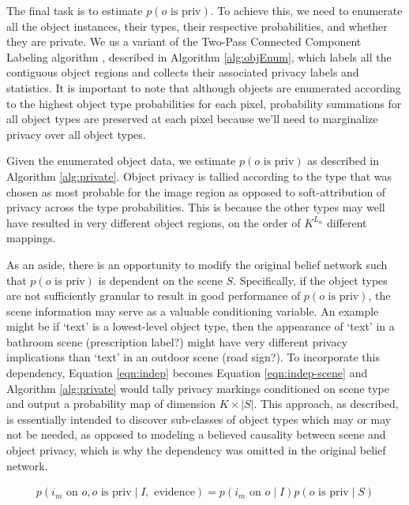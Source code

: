 \documentclass[11pt]{article}
\begin{document}
The final task is to estimate $p(o \textrm{ is priv})$.  To achieve this, we need to enumerate all the object instances, their types, their respective probabilities, and whether they are private.  We us a variant of the Two-Pass Connected Component Labeling algorithm \cite{hoshen1976percolation}, described in Algorithm \ref{alg:objEnum}, which labels all the contiguous object regions and collects their associated privacy labels and statistics.  It is important to note that although objects are enumerated according to the highest object type probabilities for each pixel, probability summations for all object types are preserved at each pixel because we'll need to marginalize privacy over all object types.

Given the enumerated object data, we estimate $p(o \textrm{ is priv})$ as described in Algorithm \ref{alg:private}.  Object privacy is tallied according to the type that was chosen as most probable for the image region as opposed to soft-attribution of privacy across the type probabilities.  This is because the other types may well have resulted in very different object regions, on the order of $K^{L_n}$ different mappings.

As an aside, there is an opportunity to modify the original belief network such that $p(o \textrm{ is priv})$ is dependent on the scene $S$.  Specifically, if the object types are not sufficiently granular to result in good performance of $p(o \textrm{ is priv})$, the scene information may serve as a valuable conditioning variable.  An example might be if `text' is a lowest-level object type, then the appearance of `text' in a bathroom scene (prescription label?) might have very different privacy implications than `text' in an outdoor scene (road sign?).  To incorporate this dependency, Equation \ref{eqn:indep} becomes Equation \ref{eqn:indep-scene} and Algorithm \ref{alg:private} would tally privacy markings conditioned on scene type and output a probability map of dimension $K \times \left| S \right|$.  This approach, as described, is essentially intended to discover sub-classes of object types which may or may not be needed, as opposed to modeling a believed causality between scene and object privacy, which is why the dependency was omitted in the original belief network.

\begin{align}
    p(i_m \textrm{ on } o, o \textrm{ is priv} \mid I, \textrm{ evidence}) = p(i_m \textrm{ on } o \mid I) p(o \textrm{ is priv} \mid S) \label{eqn:indep-scene}
\end{align}
\end{document}
